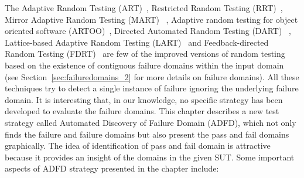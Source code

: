 





The Adaptive Random Testing (ART)~\cite{chen2005adaptive}, Restricted Random Testing (RRT)~\cite{chan2006restricted}, Mirror Adaptive Random Testing (MART) ~\cite{chen2004mirror}, Adaptive random testing for object oriented software (ARTOO)~\cite{ciupa2008artoo}, Directed Automated Random Testing (DART) ~\cite{godefroid2005dart}, Lattice-based Adaptive Random Testing (LART)~\cite{mayer2005lattice} and Feedback-directed Random Testing (FDRT)~\cite{pacheco2007randoop, pacheco2007feedback} are few of the improved versions of random testing based on the existence of contiguous failure domains within the input domain (see Section~\ref{sec:failuredomains_2} for more details on failure domains). All these techniques try to detect a single instance of failure ignoring the underlying failure domain. It is interesting that, in our knowledge, no specific strategy has been developed to evaluate the failure domains. This chapter describes a new test strategy called Automated Discovery of Failure Domain (ADFD), which not only finds the failure and failure domains but also present the pass and fail domains graphically. The idea of identification of pass and fail domain is attractive because it provides an insight of the domains in the given SUT. Some important aspects of ADFD strategy presented in the chapter include:

